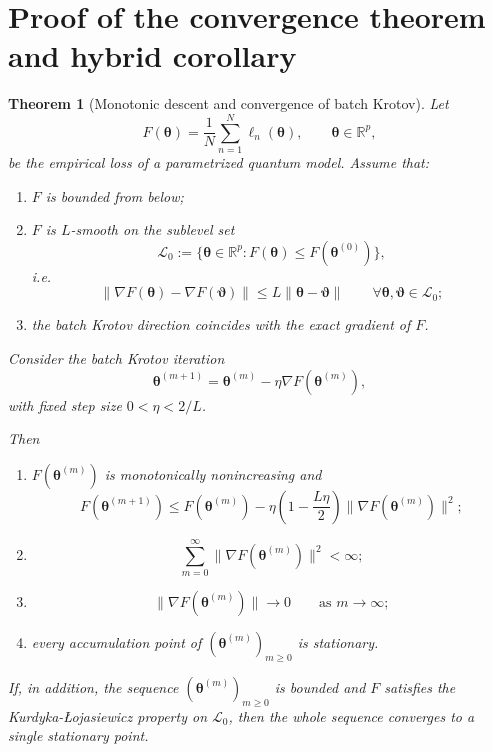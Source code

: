 \documentclass[aps,prb,10pt,twocolumn,superscriptaddress]{revtex4-2}
\newtheorem{theorem}{Theorem}
\begin{document}
\section{Proof of the convergence theorem and hybrid corollary}

\begin{theorem}[Monotonic descent and convergence of batch Krotov]
\label{thm:batch_krotov_convergence_appendix}
Let
\[
F(\bm{\theta})=\frac{1}{N}\sum_{n=1}^N \ell_n(\bm{\theta}), \qquad \bm{\theta}\in\mathbb{R}^p,
\]
be the empirical loss of a parametrized quantum model. Assume that:
\begin{enumerate}
    \item \(F\) is bounded from below;
    \item \(F\) is \(L\)-smooth on the sublevel set
    \[
    \mathcal{L}_0:=\{\bm{\theta}\in\mathbb{R}^p : F(\bm{\theta})\leq F(\bm{\theta}^{(0)})\},
    \]
    i.e.
    \[
    \|\nabla F(\bm{\theta})-\nabla F(\bm{\vartheta})\|
    \leq
    L\|\bm{\theta}-\bm{\vartheta}\|
    \qquad
    \forall \bm{\theta},\bm{\vartheta}\in\mathcal{L}_0;
    \]
    \item the batch Krotov direction coincides with the exact gradient of \(F\).
\end{enumerate}

Consider the batch Krotov iteration
\[
\bm{\theta}^{(m+1)}
=
\bm{\theta}^{(m)}-\eta \nabla F(\bm{\theta}^{(m)}),
\]
with fixed step size \(0<\eta<2/L\).

Then
\begin{enumerate}
    \item[\rm(i)] \(F(\bm{\theta}^{(m)})\) is monotonically nonincreasing and
    \[
    F(\bm{\theta}^{(m+1)})
    \leq
    F(\bm{\theta}^{(m)})
    -
    \eta\left(1-\frac{L\eta}{2}\right)\|\nabla F(\bm{\theta}^{(m)})\|^2;
    \]
    \item[\rm(ii)]
    \[
    \sum_{m=0}^{\infty}\|\nabla F(\bm{\theta}^{(m)})\|^2<\infty;
    \]
    \item[\rm(iii)]
    \[
    \|\nabla F(\bm{\theta}^{(m)})\|\to 0
    \qquad \text{as } m\to\infty;
    \]
    \item[\rm(iv)] every accumulation point of \((\bm{\theta}^{(m)})_{m\geq 0}\) is stationary.
\end{enumerate}
If, in addition, the sequence \((\bm{\theta}^{(m)})_{m\geq 0}\) is bounded and \(F\) satisfies the Kurdyka-\L{}ojasiewicz property on \(\mathcal{L}_0\), then the whole sequence converges to a single stationary point.
\end{theorem}
\end{document}
